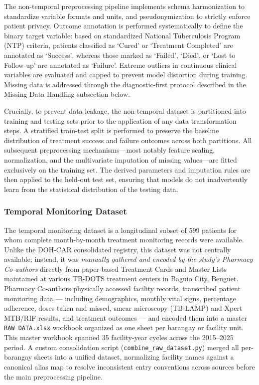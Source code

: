 \documentclass[12pt]{article}
\begin{document}
The non-temporal preprocessing pipeline implements schema harmonization to standardize variable formats and units, and pseudonymization to strictly enforce patient privacy. Outcome annotation is performed systematically to define the binary target variable: based on standardized National Tuberculosis Program (NTP) criteria, patients classified as `Cured' or `Treatment Completed' are annotated as `Success', whereas those marked as `Failed', `Died', or `Lost to Follow-up' are annotated as `Failure'. Extreme outliers in continuous clinical variables are evaluated and capped to prevent model distortion during training. Missing data is addressed through the diagnostic-first protocol described in the Missing Data Handling subsection below.

Crucially, to prevent data leakage, the non-temporal dataset is partitioned into training and testing sets prior to the application of any data transformation steps. A stratified train-test split is performed to preserve the baseline distribution of treatment success and failure outcomes across both partitions. All subsequent preprocessing mechanisms---most notably feature scaling, normalization, and the multivariate imputation of missing values---are fitted exclusively on the training set. The derived parameters and imputation rules are then applied to the held-out test set, ensuring that models do not inadvertently learn from the statistical distribution of the testing data.

\subsubsection*{Temporal Monitoring Dataset}

The temporal monitoring dataset is a longitudinal subset of 599 patients for whom complete month-by-month treatment monitoring records were available. Unlike the DOH-CAR consolidated registry, this dataset was not centrally available; instead, it was \textit{manually gathered and encoded by the study's Pharmacy Co-authors} directly from paper-based Treatment Cards and Master Lists maintained at various TB-DOTS treatment centers in Baguio City, Benguet. Pharmacy Co-authors physically accessed facility records, transcribed patient monitoring data --- including demographics, monthly vital signs, percentage adherence, doses taken and missed, smear microscopy (TB-LAMP) and Xpert MTB/RIF results, and treatment outcomes --- and encoded them into a master \texttt{RAW DATA.xlsx} workbook organized as one sheet per barangay or facility unit. This master workbook spanned 35 facility-year cycles across the 2015--2025 period. A custom consolidation script (\texttt{combine\_raw\_dataset.py}) merged all per-barangay sheets into a unified dataset, normalizing facility names against a canonical alias map to resolve inconsistent entry conventions across sources before the main preprocessing pipeline.
\end{document}
